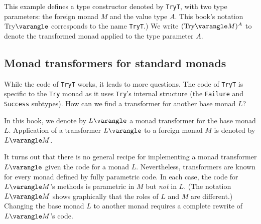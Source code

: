 This example defines a type constructor denoted by \lstinline!TryT!,
with two type parameters: the foreign monad $M$ and the value type
$A$. This book\textsf{'}s notation $\text{Try}\varangle$ corresponds to the
name \lstinline!TryT!.) We write $(\text{Try}\varangle M)^{A}$ to
denote the transformed monad applied to the type parameter $A$.

\subsection{Monad transformers for standard monads\label{subsec:Monad-transformers-for-standard-monads}}

While the code of \lstinline!TryT! works, it leads to more questions.
The code of \lstinline!TryT! is specific to the \lstinline!Try!
monad as it uses \lstinline!Try!\textsf{'}s internal structure (the \lstinline!Failure!
and \lstinline!Success! subtypes). How can we find a transformer
for another base monad $L$?

In this book, we denote by $L\varangle$ a monad transformer for the
base monad $L$. Application of a transformer $L\varangle$ to a foreign
monad $M$ is denoted by $L\varangle M$. 

It turns out that there is no general recipe for implementing a monad
transformer $L\varangle$ given the code for a monad $L$. Nevertheless,
transformers are known for every monad defined by fully parametric
code. In each case, the code for $L\varangle M$\textsf{'}s methods is parametric
in $M$ but \emph{not} in $L$. (The notation $L\varangle M$ shows
graphically that the roles of $L$ and $M$ are different.) Changing
the base monad $L$ to another monad requires a complete rewrite of
$L\varangle M$\textsf{'}s code. 

